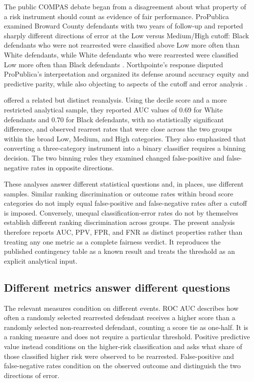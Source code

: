 \documentclass[11pt,letterpaper]{article}
\begin{document}
The public COMPAS debate began from a disagreement about what property of a risk instrument should count as evidence of fair performance. ProPublica examined Broward County defendants with two years of follow-up and reported sharply different directions of error at the Low versus Medium/High cutoff: Black defendants who were not rearrested were classified above Low more often than White defendants, while White defendants who were rearrested were classified Low more often than Black defendants \citep{angwin2016,larson2016}. Northpointe's response disputed ProPublica's interpretation and organized its defense around accuracy equity and predictive parity, while also objecting to aspects of the cutoff and error analysis \citep{dieterich2016}.

\citet{flores2016} offered a related but distinct reanalysis. Using the decile score and a more restricted analytical sample, they reported AUC values of 0.69 for White defendants and 0.70 for Black defendants, with no statistically significant difference, and observed rearrest rates that were close across the two groups within the broad Low, Medium, and High categories. They also emphasized that converting a three-category instrument into a binary classifier requires a binning decision. The two binning rules they examined changed false-positive and false-negative rates in opposite directions.

These analyses answer different statistical questions and, in places, use different samples. Similar ranking discrimination or outcome rates within broad score categories do not imply equal false-positive and false-negative rates after a cutoff is imposed. Conversely, unequal classification-error rates do not by themselves establish different ranking discrimination across groups. The present analysis therefore reports AUC, PPV, FPR, and FNR as distinct properties rather than treating any one metric as a complete fairness verdict. It reproduces the published contingency table as a known result and treats the threshold as an explicit analytical input.

\subsection{Different metrics answer different questions}

The relevant measures condition on different events. ROC AUC describes how often a randomly selected rearrested defendant receives a higher score than a randomly selected non-rearrested defendant, counting a score tie as one-half. It is a ranking measure and does not require a particular threshold. Positive predictive value instead conditions on the higher-risk classification and asks what share of those classified higher risk were observed to be rearrested. False-positive and false-negative rates condition on the observed outcome and distinguish the two directions of error.
\end{document}
